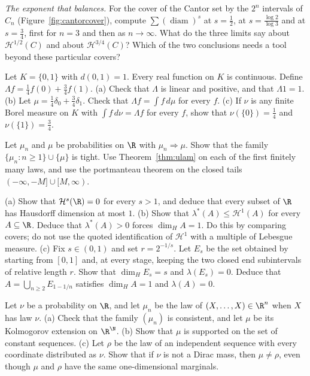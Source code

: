 \begin{exercise}[$\star$]\label{ex:coversums}
\emph{The exponent that balances.} For the cover of the Cantor set by the $2^n$ intervals of $C_n$ (Figure~\ref{fig:cantorcover}), compute
$\sum(\operatorname{diam})^s$ at $s=\frac12$, at $s=\frac{\log 2}{\log 3}$ and at $s=\frac34$, first for $n=3$ and then as $n\to\infty$. What do the three
limits say about $\mathcal H^{1/2}(C)$ and about $\mathcal H^{3/4}(C)$? Which of the two conclusions needs a tool beyond these particular
covers?
\end{exercise}

\begin{exercise}[$\star$]\label{ex:v7c12a}
Let $K=\{0,1\}$ with $d(0,1)=1$. Every real function on $K$ is continuous. Define $\Lambda f=\frac14 f(0)+\frac34 f(1)$.
(a) Check that $\Lambda$ is linear and positive, and that $\Lambda 1=1$.
(b) Let $\mu=\frac14\delta_0+\frac34\delta_1$. Check that $\Lambda f=\int f\,d\mu$ for every $f$.
(c) If $\nu$ is any finite Borel measure on $K$ with $\int f\,d\nu=\Lambda f$ for every $f$, show that $\nu(\{0\})=\frac14$ and
$\nu(\{1\})=\frac34$.
\end{exercise}

\begin{exercise}[$\star\star$]\label{ex:v7c12b}
Let $\mu_n$ and $\mu$ be probabilities on $\R$ with $\mu_n\Rightarrow\mu$. Show that the family $\{\mu_n:n\ge 1\}\cup\{\mu\}$ is tight. Use
Theorem~\ref{thm:ulam} on each of the first finitely many laws, and use the portmanteau theorem on the closed tails
$(-\infty,-M]\cup[M,\infty)$.
\end{exercise}

\begin{exercise}[$\star\star$]\label{ex:v7c12c}
(a) Show that $\mathcal H^s(\R)=0$ for every $s>1$, and deduce that every subset of $\R$ has Hausdorff dimension at most $1$.
(b) Show that $\lambda^*(A)\le\mathcal H^1(A)$ for every $A\subseteq\R$. Deduce that $\lambda^*(A)>0$ forces $\dim_H A=1$. Do this by comparing
covers; do not use the quoted identification of $\mathcal H^1$ with a multiple of Lebesgue measure.
(c) Fix $s\in(0,1)$ and set $r=2^{-1/s}$. Let $E_s$ be the set obtained by starting from $[0,1]$ and, at every stage, keeping the two closed
end subintervals of relative length $r$. Show that $\dim_H E_s=s$ and $\lambda(E_s)=0$. Deduce that
$A=\bigcup_{n\ge 2}E_{1-1/n}$ satisfies $\dim_H A=1$ and $\lambda(A)=0$.
\end{exercise}

\begin{exercise}[$\star\star\star$]\label{ex:v7c12d}
Let $\nu$ be a probability on $\R$, and let $\mu_n$ be the law of $(X,\ldots,X)\in\R^n$ when $X$ has law $\nu$.
(a) Check that the family $(\mu_n)$ is consistent, and let $\mu$ be its Kolmogorov extension on $\R^\N$.
(b) Show that $\mu$ is supported on the set of constant sequences.
(c) Let $\rho$ be the law of an independent sequence with every coordinate distributed as $\nu$. Show that if $\nu$ is not a Dirac mass, then
$\mu\ne\rho$, even though $\mu$ and $\rho$ have the same one-dimensional marginals.
\end{exercise}

